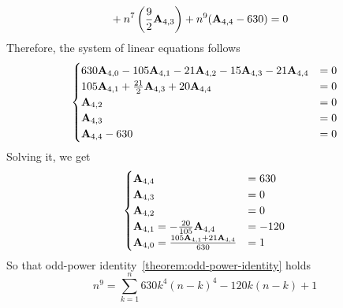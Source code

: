 \begin{example}
\begin{equation*}
\begin{split}
            &+ n^7 \left( \frac{9}{2} {\mathbf{A}} \sb{4,3} \right) + n^9 ({\mathbf{A}} \sb{4,4} - 630) = 0
        \end{split}
    \end{equation*}
    Therefore, the system of linear equations follows
    \begin{equation*}
        \begin{cases}
            630 {\mathbf{A}} \sb{4,0} - 105 {\mathbf{A}} \sb{4,1} - 21 {\mathbf{A}} \sb{4,2} - 15 {\mathbf{A}} \sb{4,3} - 21 {\mathbf{A}} \sb{4,4} &= 0 \\
            105 {\mathbf{A}} \sb{4,1} + \frac{21}{2} {\mathbf{A}} \sb{4,3} + 20 {\mathbf{A}} \sb{4,4} &= 0 \\
            {\mathbf{A}} \sb{4,2} &= 0 \\
            {\mathbf{A}} \sb{4,3} &= 0 \\
            {\mathbf{A}} \sb{4,4} - 630 &= 0
        \end{cases}
    \end{equation*}
    Solving it, we get
    \begin{equation*}
        \begin{cases}
            {\mathbf{A}} \sb{4,4} &= 630 \\
            {\mathbf{A}} \sb{4,3} &= 0 \\
            {\mathbf{A}} \sb{4,2} &= 0 \\
            {\mathbf{A}} \sb{4,1} = - \frac{20}{105} {\mathbf{A}} \sb{4,4} &= -120 \\
            {\mathbf{A}} \sb{4,0} = \frac{105 {\mathbf{A}} \sb{4,1} + 21 {\mathbf{A}} \sb{4,4}}{630} &= 1
        \end{cases}
    \end{equation*}
    So that odd-power identity~\eqref{theorem:odd-power-identity} holds
    \begin{equation*}
        n^9 = \sum_{k=1}^{n} 630 k^4(n-k)^4 - 120k(n-k) + 1
    \end{equation*}
\end{example}
